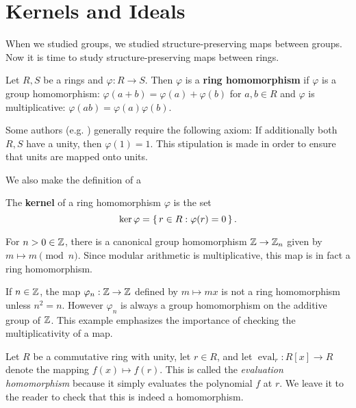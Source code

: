 \documentclass[./main.tex]{subfiles}
\begin{document}
\section{Kernels and Ideals}
When we studied groups, we studied structure-preserving maps between groups. Now
it is time to study structure-preserving maps between rings. 

\begin{definition}
\label{def:ring-homomorphisms}
Let $R, S$ be a rings and $\varphi: R \to S$. Then $\varphi$ is a \textbf{ring
homomorphism} if $\varphi$ is a group homomorphism: $\varphi(a+b) = \varphi(a) +
\varphi(b)$ for $a,b \in R$ and $\varphi$ is multiplicative: $\varphi(ab) =
\varphi(a) \varphi(b)$.
\end{definition}

Some authors (e.g. \cite{Jacobson_2009}) generally require the following axiom:
If additionally both $R, S$ have a unity, then $\varphi(1) = 1$. This
stipulation is made in order to ensure that units are mapped onto units. 

We also make the definition of a 
\begin{definition}[Kernel]
\label{def:ring-homomorphism-kernel}
The \textbf{kernel} of a ring homomorphism $\varphi$ is the set 
\[
    \ker \varphi = \set{r \in R: \varphi(r) = 0}.
\]
\end{definition}


\begin{example}
    For $n > 0 \in \mathbb{Z}$, there is a canonical group homomorphism $\mathbb{Z} \to \mathbb{Z}_n$
    given by $m \mapsto m \pmod n$. Since modular arithmetic is multiplicative,
    this map is in fact a ring homomorphism. 
\end{example}

\begin{example}
    If $n \in \mathbb{Z}$, the map $\varphi_n: \mathbb{Z} \to \mathbb{Z}$ defined by $m \mapsto mx$
    is not a ring homomorphism unless $n^2 = n$. However $\varphi_n$ is always a
    group homomorphism on the additive group of $\mathbb{Z}$. This example emphasizes
    the importance of checking the multiplicativity of a map.
\end{example}

\begin{example}
    Let $R$ be a commutative ring with unity, let $r \in R$, and let
    $\operatorname{eval}_r: R[x] \to R$ denote the mapping $f(x) \mapsto f(r)$.
    This is called the \emph{evaluation homomorphism} because it simply
    evaluates the polynomial $f$ at $r$. We leave it to the reader to check that
    this is indeed a homomorphism. 
\end{example}
\end{document}

